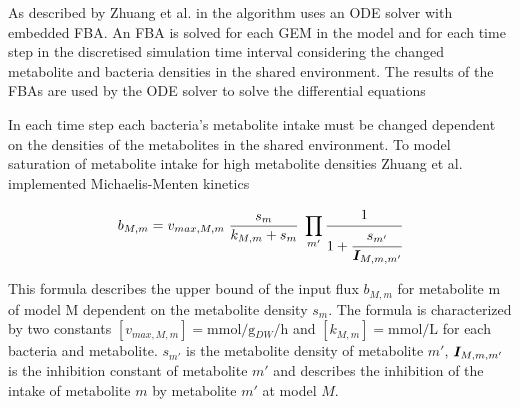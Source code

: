 As described by Zhuang et al. in \cite{zhuang_genome-scale_2011} the algorithm uses an ODE solver with embedded FBA. An FBA is solved
for each GEM in the model and for each time step in the discretised simulation time interval considering the changed metabolite and
bacteria densities in the shared environment. The results of the FBAs are used by the ODE solver to solve the differential equations



In each time step each bacteria's metabolite intake must be changed dependent on the densities of the metabolites in the shared environment.
To model saturation of metabolite intake for high metabolite densities Zhuang et al. implemented Michaelis-Menten kinetics \cite{johnson2011original}

\begin{equation} \label{eq:michaelis-menten}
 b_{M,m} = v_{max,M,m} \; \frac{s_m}{k_{M,m}+s_m} \; \prod_{m'} \cfrac{1}{1+\cfrac{s_{m'}}{\mat{I}_{M,m,m'}}}
\end{equation}

This formula describes the upper bound of the input flux $b_{M,m}$ for metabolite m of model M dependent on the metabolite density
$s_m$. The formula is characterized by two constants $\left[ v_{max,M,m} \right] = \si{\milli\mole\per\gram_{DW}\per\hour}$ and $\left[ k_{M,m} \right] = \si{\milli\mole\per\liter}$
for each bacteria and metabolite. $s_{m'}$ is the metabolite density of metabolite $m'$, $\bm{I}_{M,m,m'}$ is the inhibition constant of metabolite $m'$ and
describes the inhibition of the intake of metabolite $m$ by metabolite $m'$ at model $M$.

